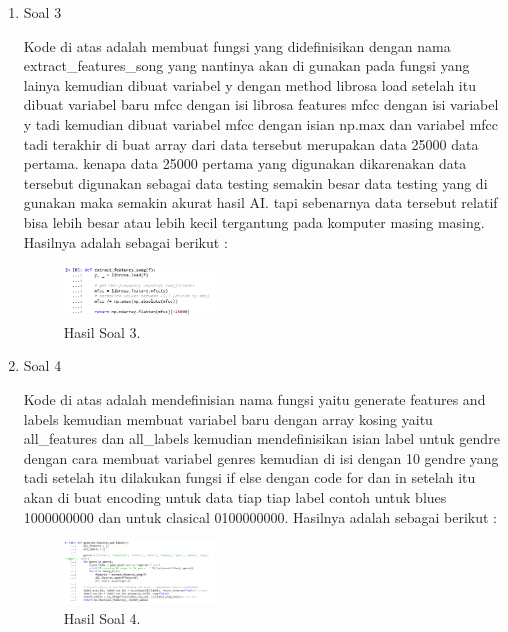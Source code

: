 \begin{enumerate}
	\item Soal 3
	\hfill\break
	
	Kode di atas adalah membuat fungsi yang didefinisikan dengan nama extract\_features\_song yang nantinya akan di gunakan pada fungsi yang lainya kemudian dibuat variabel y dengan method librosa load setelah itu dibuat variabel baru mfcc dengan isi librosa features mfcc dengan isi variabel y tadi kemudian dibuat variabel mfcc dengan isian np.max dan variabel mfcc tadi terakhir di buat array dari data tersebut merupakan data 25000 data pertama. kenapa data 25000 pertama yang digunakan dikarenakan data tersebut digunakan sebagai data testing semakin besar data testing yang di gunakan maka semakin akurat hasil AI. tapi sebenarnya data tersebut relatif bisa lebih besar atau lebih kecil tergantung pada komputer masing masing. Hasilnya adalah sebagai berikut :
	\begin{figure}[H]
	\centering
		\includegraphics[width=4cm]{figures/1174077/6/10.png}
		\caption{Hasil Soal 3.}
	\end{figure}

	\item Soal 4
	\hfill\break
	
	Kode di atas adalah mendefinisian nama fungsi yaitu generate features and labels kemudian membuat variabel baru dengan array kosing yaitu all\_features dan all\_labels kemudian mendefinisikan isian label untuk gendre dengan cara membuat variabel genres kemudian di isi dengan 10 gendre yang tadi setelah itu dilakukan fungsi if else dengan code for dan in setelah itu akan di buat encoding untuk data tiap tiap label contoh untuk blues 1000000000 dan untuk clasical 0100000000. Hasilnya adalah sebagai berikut :
	\begin{figure}[H]
	\centering
		\includegraphics[width=4cm]{figures/1174077/6/11.png}
		\caption{Hasil Soal 4.}
	\end{figure}


\end{enumerate}
